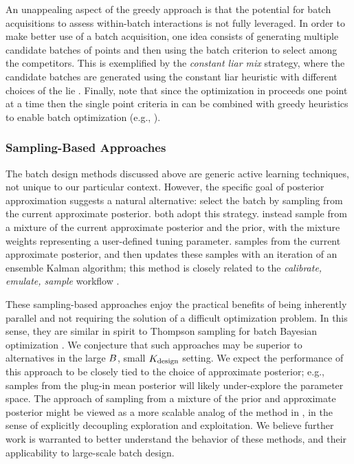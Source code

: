 \documentclass[12pt]{article}
\begin{document}
An unappealing aspect of the greedy approach is that the potential for batch acquisitions to assess within-batch
interactions is not fully leveraged. In order to make better use of a batch acquisition, one idea consists of generating
multiple candidate batches of points and then using the batch criterion to select among the competitors. This is
exemplified by the \textit{constant liar mix} strategy, where the candidate batches are generated using the constant
liar heuristic with different choices of the lie \citep{Chevalier2013}.
Finally, note that since the optimization in  proceeds one point at a time then the single point criteria
in  can be combined with greedy heuristics to enable batch optimization (e.g., \citet{VehtariParallelGP}).

\subsubsection{Sampling-Based Approaches}
The batch design methods discussed above are generic active learning techniques, not unique to our particular
context. However, the specific goal of posterior approximation suggests a natural alternative: select the batch by sampling from the 
current approximate posterior. \citep{hydrologicalModel,quantileApprox} both adopt this strategy.
\citet{FerEmulation} instead sample from a mixture of the current approximate posterior and the prior, with the mixture weights 
representing a user-defined tuning parameter. \citet{adaptiveMultimodal} samples from the current approximate posterior, and
then updates these samples with an iteration of an ensemble Kalman algorithm; this method is 
closely related to the \textit{calibrate, emulate, sample} workflow \citep{CES}.

These sampling-based approaches enjoy the practical benefits of being inherently parallel and not requiring the solution
of a difficult optimization problem. In this sense, they are similar in spirit to Thompson sampling for
batch Bayesian optimization \citep{parallelBOThompson}. We conjecture that such approaches may be superior to 
alternatives in the large $B$, small $K_{\textrm{design}}$ setting. We expect the performance of this approach to be closely 
tied to the choice of approximate posterior; e.g., samples from the plug-in mean posterior will likely under-explore the 
parameter space. The \citet{FerEmulation} approach of sampling from a mixture of the prior and approximate posterior might
be viewed as a more scalable analog of the method in \citet{gp_surrogates_random_exploration}, in the sense of 
explicitly decoupling exploration and exploitation. We believe further work is warranted to better understand the 
behavior of these methods, and their applicability to large-scale batch design.
\end{document}
